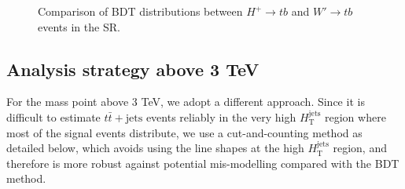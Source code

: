 \begin{description}
\begin{figure}[H]
{        }  
        \caption{Comparison of BDT distributions between $H^{+} \rightarrow tb$ and  $W' \rightarrow tb$ events in the SR.}
        \label{fig:CompHpAndWp}
    \end{figure}
    
\end{description}

\subsection{Analysis strategy above 3 TeV}
\label{subsec:AnaStrategyAbove3TeV}
For the mass point above 3 TeV, we adopt a different approach. Since it is difficult to estimate $t\bar{t}+\text{jets}$ events reliably in the very high $H_{\text{T}}^{\text{jets}}$ region where most of the signal events distribute, we use a cut-and-counting method as detailed below, which avoids using the line shapes at the high $H_{\text{T}}^{\text{jets}}$ region, and therefore is more robust against potential mis-modelling compared with the BDT method. 

